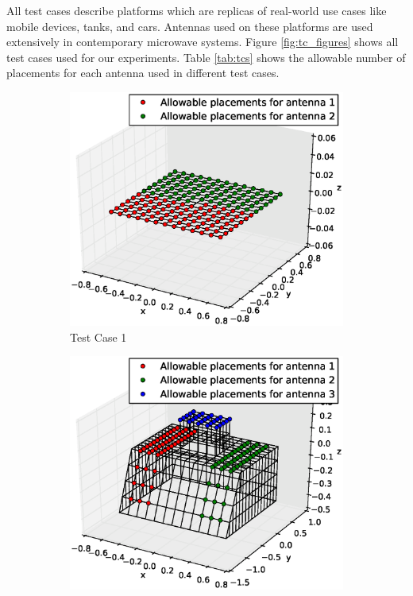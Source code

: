 \documentclass[conference]{IEEEtran}
\begin{document}
All test cases describe platforms which are replicas of real-world use cases like mobile devices, tanks, and cars. Antennas used on these platforms are used extensively in contemporary microwave systems. Figure \ref{fig:tc_figures} shows all test cases used for our experiments. Table \ref{tab:tcs} shows the allowable number of placements for each antenna used in different test cases. 
\begin{figure}
    \centering
    \begin{subfigure}{.5\columnwidth}
        \includegraphics[width=\columnwidth,height=\columnwidth]{FIG/tc_1_figure}%
        \caption{Test Case 1}%
    \label{fig:tc1_figure}%
    \end{subfigure}\hfill%
    \begin{subfigure}{.5\columnwidth}
        \includegraphics[width=\columnwidth, height=\columnwidth]{FIG/tc_2_figure}%

\end{subfigure}
\end{figure}
\end{document}
